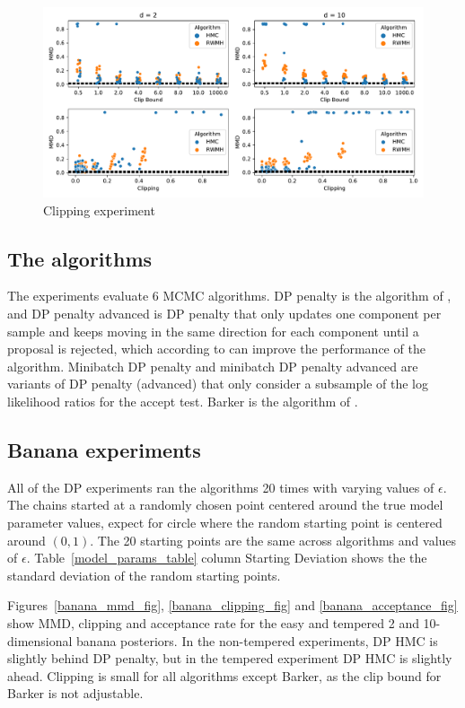 ﻿\documentclass[a4paper]{article}
\begin{document}
\begin{figure}[h]
  \centering
  \includegraphics[width=\textwidth]{figures/clipping}
  \caption{Clipping experiment}
  \label{clip_fig}
\end{figure}

\subsection{The algorithms}

The experiments evaluate 6 MCMC algorithms. DP penalty is the
algorithm of \textcite{YildirimE19}, and DP penalty advanced is
DP penalty that only updates one component per sample and
keeps moving in the same direction for each component until a proposal
is rejected, which according to \textcite{YildirimE19} can improve
the performance of the algorithm. Minibatch DP penalty and minibatch DP
penalty advanced are variants of DP penalty (advanced) that only
consider a subsample of the log likelihood ratios for the accept test.
Barker is the algorithm of \textcite{HeikkilaJDH19}.

\subsection{Banana experiments}

All of the DP experiments ran the algorithms 20 times with varying
values of \(\epsilon\). The chains started at a randomly chosen point
centered around the true model parameter values, expect for circle where
the random starting point is centered around \((0, 1)\). The 20 starting
points are the same across algorithms and values of \(\epsilon\).
Table~\ref{model_params_table} column Starting Deviation shows the
the standard deviation of the random starting points.

Figures~\ref{banana_mmd_fig}, \ref{banana_clipping_fig} and
\ref{banana_acceptance_fig} show MMD, clipping and acceptance rate
for the easy and tempered 2 and 10-dimensional banana posteriors.
In the non-tempered experiments, DP HMC is slightly behind DP penalty, but
in the tempered experiment DP HMC is slightly ahead. Clipping is small for
all algorithms except Barker, as the clip bound for Barker is not
adjustable.
\end{document}
